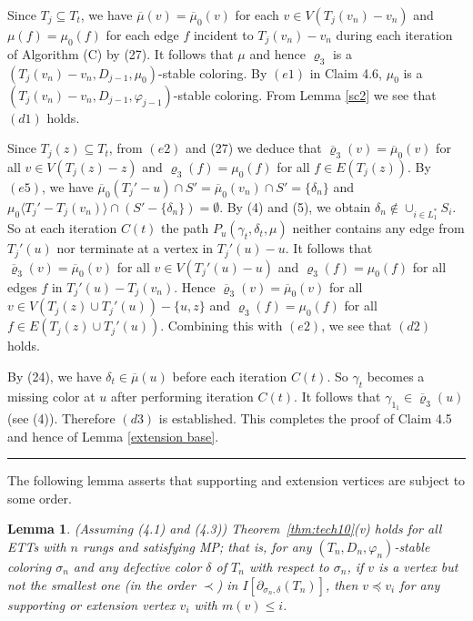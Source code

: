 \documentclass[11pt]{article}
\newtheorem{lemma}[theorem]{Lemma}
\newcommand{\rhobar}{\overline{\varrho}}
\newcommand{\phiv}{\varphi}
\def\qed{\hfill \rule{4pt}{7pt}}
\begin{document}
Since $T_j \subseteq T_t$, we have $\overline{\mu}(v) = \overline{\mu}_0(v)$ for each $v\in V(T_j(v_n)-v_n)$ 
and $\mu(f) = \mu_0(f)$ for each edge $f$ incident to $T_j(v_n) - v_n$ during each iteration of Algorithm (C) 
by (27). It follows that $\mu$ and hence $\varrho_3$ is a $(T_j(v_n) - v_n, D_{j-1}, \mu_0)$-stable coloring. 
By $(e1)$ in Claim 4.6, $\mu_0$ is a $(T_j(v_n) -v_n, D_{j-1}, \phiv_{j-1})$-stable coloring. From 
Lemma \ref{sc2} we see that $(d1)$ holds. 

Since $T_j(z) \subseteq T_t$, from $(e2)$ and (27) we deduce that $\rhobar_3(v) = \overline{\mu}_0(v)$ for all $v\in V(T_j(z)-z)$ 
and $\varrho_3(f) = \mu_0(f)$ for all $f\in E(T_j(z))$.  By $(e5)$, we have $\overline{\mu}_0 (T_j'-u) \cap S'= \overline{\mu}_0 (v_n) \cap S' = 
\{\delta_n\}$ and $\mu_0 \langle T_j' -T_j(v_n) \rangle \cap (S'-\{\delta_n\})=\emptyset$. By (4) and (5), 
we obtain $\delta_n \notin \cup_{i \in L_1^*} S_i$. So at each iteration $C(t)$ the path  
$P_u(\gamma_t, \delta_t, \mu)$ neither contains any edge from $T_j'(u)$ nor terminate at a 
vertex in $T_j'(u)-u$. It follows that $\rhobar_3(v) = \overline{\mu}_0(v)$ for all $v\in V(T_j'(u)-u)$
and $\varrho_3(f) = \mu_0(f)$ for all edges $f$ in  $T_j'(u) -T_j(v_n)$. Hence $\overline{\varrho}_3(v)=
\overline{\mu}_0(v)$ for all $v\in V(T_j(z)\cup T_j'(u))-\{u,z\}$ and $\varrho_3 (f)={\mu}_0(f)$ for all $f\in 
E(T_j(z)\cup T_j'(u))$. Combining this with $(e2)$, we see that $(d2)$ holds. 

By (24), we have $\delta_t \in \overline{\mu}(u)$ before each iteration $C(t)$. So $\gamma_t$ becomes a 
missing color at $u$ after performing iteration $C(t)$. It follows that $\gamma_{1_1}\in \overline{\varrho}_3 (u)$ (see (4)).
Therefore $(d3)$ is established. This completes the proof of Claim 4.5 and hence of Lemma \ref{extension base}. \qed


\vskip 3mm

The following lemma asserts that supporting and extension vertices are subject to some order.

\begin{lemma}\label{basic2}
(Assuming (4.1) and (4.3)) Theorem~\ref{thm:tech10}(v) holds for all ETTs with $n$ rungs and satisfying MP; 
that is, for any $(T_n, D_n, \phiv_n)$-stable coloring $\sigma_n$ and any defective color $\delta$ of $T_n$ 
with respect to $\sigma_n$, if $v$ is a vertex but not the smallest one (in the order $\prec$)  
in $I[\partial_{\sigma_n, \delta}(T_n)]$, then $v \preceq v_i$ for any supporting or extension vertex  
$v_i$ with $m(v) \le i$.
 
\end{lemma}
\end{document}
